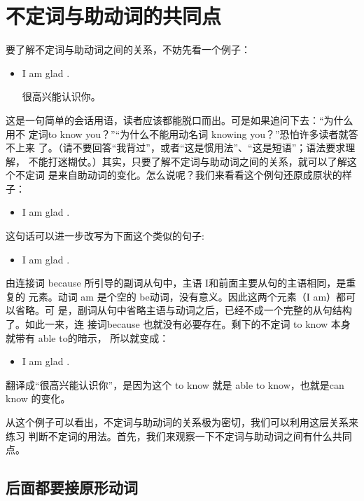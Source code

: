 \section{不定词与助动词的共同点}

要了解不定词与助动词之间的关系，不妨先看一个例子：

\begin{itemize}
\item  I am glad .

  很高兴能认识你。
\end{itemize}

这是一句简单的会话用语，读者应该都能脱口而出。可是如果追问下去：“为什么用不
定词to know you？”“为什么不能用动名词 knowing you？”恐怕许多读者就答不上来
了。（请不要回答“我背过”，或者“这是惯用法”、“这是短语”；语法要求理解，
不能打迷糊仗。）其实，只要了解不定词与助动词之间的关系，就可以了解这个不定词
是来自助动词的变化。怎么说呢？我们来看看这个例句还原成原状的样子：

\begin{itemize}
\item  I am glad .
\end{itemize}

这句话可以进一步改写为下面这个类似的句子:

\begin{itemize}
\item  I am glad .
\end{itemize}

由连接词 because 所引导的副词从句中，主语 I和前面主要从句的主语相同，是重复的
元素。动词 am 是个空的 be动词，没有意义。因此这两个元素（I am）都可以省略。可
是，副词从句中省略主语与动词之后，已经不成一个完整的从句结构了。如此一来，连
接词because 也就没有必要存在。剩下的不定词 to know 本身就带有 able to的暗示，
所以就变成：

\begin{itemize}
\item  I am glad .
\end{itemize}

翻译成“很高兴能认识你”，是因为这个 to know 就是 able to know，也就是can
know 的变化。

从这个例子可以看出，不定词与助动词的关系极为密切，我们可以利用这层关系来练习
判断不定词的用法。首先，我们来观察一下不定词与助动词之间有什么共同点。

\subsection{后面都要接原形动词}

